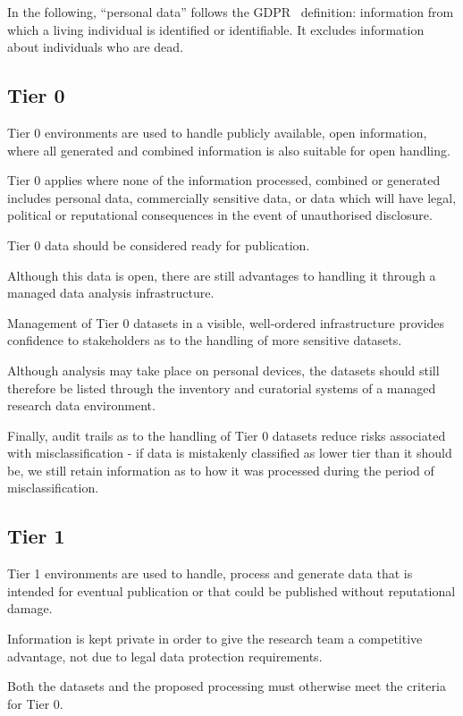 \documentclass[10pt,a4paper,twocolumn]{article}
\begin{document}
In the following, ``personal data'' follows the GDPR~\cite{GDPR} definition: information from which a living individual is identified or identifiable. It excludes information about individuals who
are dead.

\subsection{Tier 0}

Tier 0 environments are used to handle publicly available, open information, where all generated and combined
information is also suitable for open handling. 

Tier 0 applies where none of the information
processed, combined or generated includes personal data, commercially sensitive data, or data which will have legal, political or reputational consequences in the event of unauthorised disclosure.

Tier 0 data should be considered ready for publication.

Although this data is open, there are still advantages to handling it through a managed data analysis infrastructure. 

Management of Tier 0 datasets in a visible, well-ordered infrastructure provides confidence to stakeholders as to the handling of more sensitive datasets. 

Although analysis may take place on personal devices, the datasets should still therefore be listed through the inventory and curatorial systems of a managed research data environment.

Finally, audit trails as to the handling of Tier 0 datasets reduce risks associated with misclassification - if data is mistakenly classified as lower tier than it should be, we still retain information as to how it was processed during the period of misclassification.

\subsection{Tier 1}

Tier 1 environments are used to handle, process and generate
data that is intended for eventual publication or that could be published without reputational damage. 

Information is kept private in order to give the research team a competitive advantage, not due to legal data protection requirements.

Both the datasets and the proposed processing must otherwise meet the criteria for Tier 0.
\end{document}
